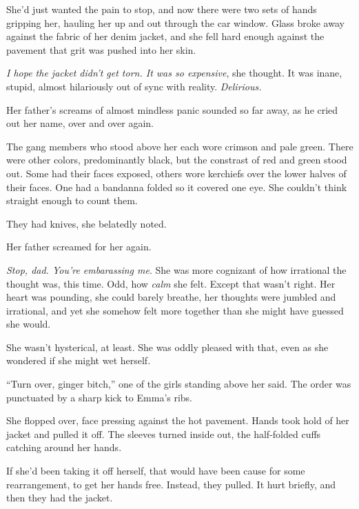 She'd just wanted the pain to stop, and now there were two sets of hands gripping her, hauling her up and out through the car window.  Glass broke away against the fabric of her denim jacket, and she fell hard enough against the pavement that grit was pushed into her skin.



\emph{I hope the jacket didn't get torn.  It was so expensive}, she thought.  It was inane, stupid, almost hilariously out of sync with reality.  \emph{Delirious.}



Her father's screams of almost mindless panic sounded so far away, as he cried out her name, over and over again.



The gang members who stood above her each wore crimson and pale green.  There were other colors, predominantly black, but the constrast of red and green stood out.  Some had their faces exposed, others wore kerchiefs over the lower halves of their faces.  One had a bandanna folded so it covered one eye.  She couldn't think straight enough to count them.



They had knives, she belatedly noted.



Her father screamed for her again.



\emph{Stop, dad.  You're embarassing me}.  She was more cognizant of how irrational the thought was, this time.  Odd, how \emph{calm} she felt.  Except that wasn't right.  Her heart was pounding, she could barely breathe, her thoughts were jumbled and irrational, and yet she somehow felt more together than she might have guessed she would.



She wasn't hysterical, at least.  She was oddly pleased with that, even as she wondered if she might wet herself.



``Turn over, ginger bitch,'' one of the girls standing above her said.  The order was punctuated by a sharp kick to Emma's ribs.



She flopped over, face pressing against the hot pavement.  Hands took hold of her jacket and pulled it off.  The sleeves turned inside out, the half-folded cuffs catching around her hands.



If she'd been taking it off herself, that would have been cause for some rearrangement, to get her hands free.  Instead, they pulled.  It hurt briefly, and then they had the jacket.



